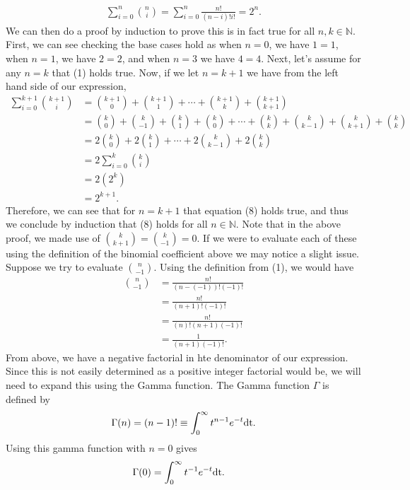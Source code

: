 \begin{align}
	\sum_{i=0}^{n}{{n}\choose{i}} =\sum_{i=0}^{n}\frac{n!}{(n-i)!i!}= 2^n.
\end{align}
We can then do a proof by induction to prove this is in fact true for all $n,k \in \mathbb{N}$. First, we can see checking the base cases hold as when $n=0$, we have $1=1$, when $n=1$, we have $2=2$, and when $n=3$ we have $4=4$. Next, let's assume for any $n=k$ that (1) holds true. Now, if we let $n=k+1$ we have from the left hand side of our expression,
\begin{align}
	\sum_{i=0}^{k+1}{{k+1}\choose{i}}&={{k+1}\choose{0}}+{{k+1}\choose{1}}+\cdots+{{k+1}\choose{k}}+{{k+1}\choose{k+1}} \\
	&={{k}\choose{0}}+{{k}\choose{-1}}+{{k}\choose{1}}+{{k}\choose{0}}+\cdots+{{k}\choose{k}}+{{k}\choose{k-1}}+{{k}\choose{k+1}}+{{k}\choose{k}}\\
	&=2{{k}\choose{0}}+2{{k}\choose{1}}+\cdots+2{{k}\choose{k-1}}+2{{k}\choose{k}}\\
	&=2\sum_{i=0}^{k}{{k}\choose{i}}\\
	&=2(2^k)\\
	&=2^{k+1}.
\end{align}
Therefore, we can see that for $n=k+1$ that equation (8) holds true, and thus we conclude by induction that (8) holds for all $n\in\mathbb{N}$. Note that in the above proof, we made use of ${{k}\choose{k+1}}={{k}\choose{-1}}=0$. If we were to evaluate each of these using the definition of the binomial coefficient above we may notice a slight issue. Suppose we try to evaluate ${{n}\choose{-1}}$. Using the definition from (1), we would have
\begin{align}
	{{n}\choose{-1}}&=\frac{n!}{(n-(-1))!(-1)!}\\&=\frac{n!}{(n+1)!(-1)!} \\
	&=\frac{n!}{(n)!(n+1)(-1)!} \\
	&=\frac{1}{(n+1)(-1)!}.
\end{align}
From above, we have a negative factorial in hte denominator of our expression. Since this is not easily determined as a positive integer factorial would be, we will need to expand this using the Gamma function. The Gamma function $\Gamma$ is defined by
\begin{align}
	\Gamma(n)=(n-1)!\equiv\int_{0}^{\infty}t^{n-1}e^{-t}\textnormal{dt}.
\end{align}
Using this gamma function with $n=0$ gives
\begin{align}
	\Gamma(0)&=\int_{0}^{\infty}t^{-1}e^{-t}\textnormal{dt}.
\end{align}
